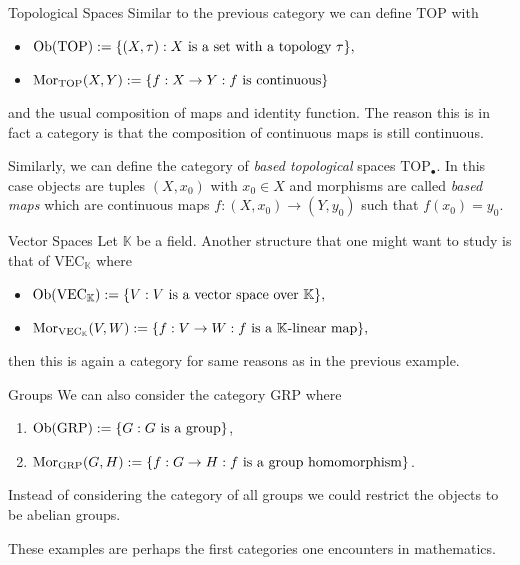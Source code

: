\begin{example}{Topological Spaces}{}
Similar to the previous category we can define $\mathrm{TOP}$ with
\begin{itemize}
    \item $\mathrm {Ob}(\mathrm{TOP}) := \{(X,\tau) : \text{$X$ is a set with a topology $\tau$}\},$
    \item $\mathrm {Mor}_{\mathrm{TOP}}(X,Y) := \{f: X \to Y: \text{$f$ is continuous}\}$
\end{itemize}
and the usual composition of maps and identity function. The reason this is in fact a category is that the composition of continuous maps is still continuous.

Similarly, we can define the category of \emph{based topological} spaces $\mathrm{TOP}_\bullet$. In this case objects are tuples $(X,x_0)$ with $x_0 \in X$ and morphisms are called \emph{based maps} which are continuous maps $f: (X,x_0) \to (Y,y_0)$ such that $f(x_0) = y_0$.
\end{example}

\begin{example}{Vector Spaces}{}
Let $\mathbb{K}$ be a field. Another structure that one might want to study is that of $\mathrm{VEC}_\mathbb{K}$ where
\begin{itemize}
    \item $\mathrm {Ob}(\mathrm{VEC}_\mathbb{K}) := \{V : \text{$V$ is a vector space over $\mathbb{K}$}\},$
    \item $\mathrm {Mor}_{\mathrm{VEC}_\mathbb{K}}(V,W) := \{f: V \to W : \text{$f$ is a $\mathbb{K}$-linear map}\},$
\end{itemize}
then this is again a category for same reasons as in the previous example.
\end{example}

\begin{example}{Groups}{}
We can also consider the category $\mathrm{GRP}$ where
\begin{enumerate}
    \item $\mathrm {Ob}(\mathrm{GRP}) := \{G : \text{$G$ is a group}\}$,
    \item $\mathrm {Mor}_{\mathrm{GRP}}(G,H) := \{f: G \to H : \text{$f$ is a group homomorphism}\}$.
\end{enumerate}
Instead of considering the category of all groups we could restrict the objects to be abelian groups.
\end{example}

These examples are perhaps the first categories one encounters in mathematics. 

